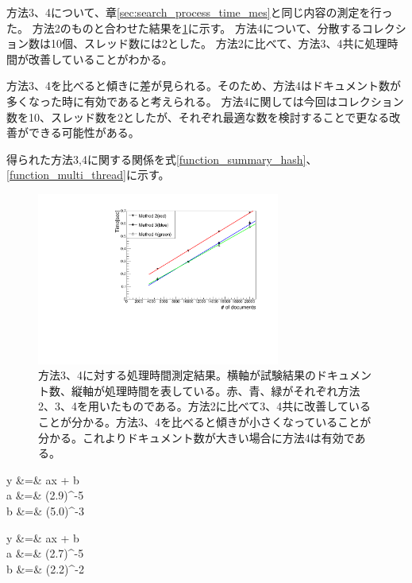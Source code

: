 方法3、4について、章\ref{sec:search_process_time_mes}と同じ内容の測定を行った。
方法2のものと合わせた結果を\ref{searching_time_2}に示す。
方法4について、分散するコレクション数は10個、スレッド数には2とした。
方法2に比べて、方法3、4共に処理時間が改善していることがわかる。

方法3、4を比べると傾きに差が見られる。そのため、方法4はドキュメント数が多くなった時に有効であると考えられる。
方法4に関しては今回はコレクション数を10、スレッド数を2としたが、それぞれ最適な数を検討することで更なる改善ができる可能性がある。

得られた方法3,4に関する関係を式\ref{function_summary_hash}、\ref{function_multi_thread}に示す。

\begin{figure}[bpt]
  \begin{center}
    \includegraphics[width=8cm,angle=270]{searching_time_2.pdf}
  \caption[方法3、4に対する処理時間測定結果]{方法3、4に対する処理時間測定結果。横軸が試験結果のドキュメント数、縦軸が処理時間を表している。赤、青、緑がそれぞれ方法2、3、4を用いたものである。方法2に比べて3、4共に改善していることが分かる。方法3、4を比べると傾きが小さくなっていることが分かる。これよりドキュメント数が大きい場合に方法4は有効である。}
  \label{searching_time_2}
  \end{center}
\end{figure}

\bbb
y &=& ax + b \\
\label{function_summary_hash}
a &=& (2.9)^{-5} \nonumber \\
b &=& (5.0)^{-3} \nonumber
\eee

\bbb
y &=& ax + b \\
\label{function_multi_thread}
a &=& (2.7)^{-5} \nonumber \\
b &=& (2.2)^{-2} \nonumber
\eee

